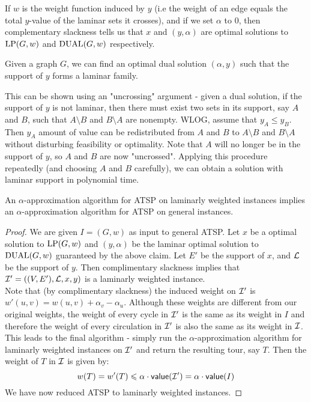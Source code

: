 \documentclass[./main.tex]{subfiles}
\begin{document}
	If $w$ is the weight function induced by $y$ (i.e the weight of an edge equals the total $y$-value of the laminar sets it crosses), and if we set $\alpha$ to $0$, then complementary slackness tells us that $x$ and $(y,\alpha)$ are optimal solutions to $\textup{LP}(G,w)$ and $\textup{DUAL}(G,w)$ respectively.\\

	\begin{claim*}
		Given a graph $G$, we can find an optimal dual solution $(\alpha, y)$ such that the support of $y$ forms a laminar family.
	\end{claim*}

	This can be shown using an "uncrossing" argument - given a dual solution, if the support of $y$ is not laminar, then there must exist two sets in its support, say $A$ and $B$, such that $A\setminus B$ and $B\setminus A$ are nonempty.
	WLOG, assume that $y_A \leqslant y_B$. Then $y_A$ amount of value can be redistributed from $A$ and $B$ to $A\setminus B$ and $B\setminus A$ without disturbing feasibility or optimality.
	Note that $A$ will no longer be in the support of $y$, so $A$ and $B$ are now "uncrossed".
	Applying this procedure repeatedly (and choosing $A$ and $B$ carefully), we can obtain a solution with laminar support in polynomial time.\\
		\begin{theorem}
			An $\alpha$-approximation algorithm for ATSP on laminarly weighted instances implies an $\alpha$-approximation algorithm for ATSP on general instances.
		\end{theorem}
		\begin{proof}
			We are given $I=(G,w)$ as input to general ATSP. Let $x$ be a optimal solution to $\textup{LP}(G,w)$ and $(y,\alpha)$ be the laminar optimal solution to $\textup{DUAL}(G,w)$ guaranteed by the above claim.
			Let $E'$ be the support of $x$, and $\mathcal{L}$ be the support of $y$. Then complimentary slackness implies that $\mathcal{I}'=((V,E'), \mathcal{L}, x, y)$ is a laminarly weighted instance.\vspace{2mm}\\
			Note that (by complimentary slackness) the induced weight on $\mathcal{I}'$ is $w'(u,v) = w(u,v) + \alpha_v - \alpha_u$. Although these weights are different from our original weights, the weight of every cycle in $\mathcal{I}'$ is the same as its weight in $I$ and therefore the weight of every circulation in $\mathcal{I}'$ is also the same as its weight in $\mathcal{I}$.
			This leads to the final algorithm - simply run the $\alpha$-approximation algorithm for laminarly weighted instances on $\mathcal{I}'$ and return the resulting tour, say $T$.
			Then the weight of $T$ in $\mathcal{I}$ is given by:
			\[
				w(T) = w'(T)\leqslant \alpha\cdot \textsf{\textup{value}}(\mathcal{I}') = \alpha\cdot\textsf{\textup{value}}(I)
			\]
			We have now reduced ATSP to laminarly weighted instances.
		\end{proof}
\end{document}
